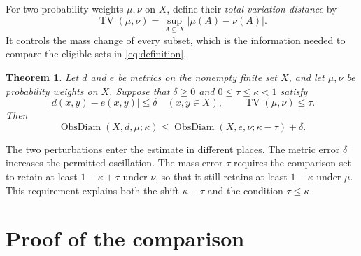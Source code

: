 \documentclass[a4paper,11pt]{article}
\newtheorem{theorem}{Theorem}
\DeclareMathOperator{\ObsDiam}{ObsDiam}
\DeclareMathOperator{\TV}{TV}
\begin{document}
For two probability weights $\mu,\nu$ on $X$, define their
\emph{total variation distance} by
\begin{equation}\label{eq:tvdef}
 \TV(\mu,\nu)=\sup_{A\subseteq X}|\mu(A)-\nu(A)|.
\end{equation}
It controls the mass change of every subset, which is the information
needed to compare the eligible sets in \eqref{eq:definition}.

\begin{theorem}\label{thm:comparison}
Let $d$ and $e$ be metrics on the nonempty finite set $X$, and let
$\mu,\nu$ be probability weights on $X$. Suppose that $\delta\ge0$ and
$0\le\tau\le\kappa<1$ satisfy
\[
 |d(x,y)-e(x,y)|\le\delta\quad(x,y\in X),
 \qquad \TV(\mu,\nu)\le\tau.
\]
Then
\begin{equation}\label{eq:comparison}
 \ObsDiam(X,d,\mu;\kappa)
 \le \ObsDiam(X,e,\nu;\kappa-\tau)+\delta.
\end{equation}
\end{theorem}

The two perturbations enter the estimate in different places. The
metric error $\delta$ increases the permitted oscillation. The mass
error $\tau$ requires the comparison set to retain at least
$1-\kappa+\tau$ under $\nu$, so that it still retains at least
$1-\kappa$ under $\mu$. This requirement explains both the shift
$\kappa-\tau$ and the condition $\tau\le\kappa$.

\section{Proof of the comparison}
\end{document}
